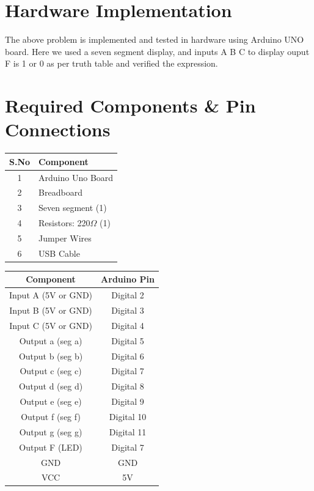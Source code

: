 \documentclass[a4paper,12pt]{article}
\begin{document}
\section*{\textbf{Hardware Implementation}}
The above problem is implemented and tested in hardware using Arduino UNO board. Here we used a seven segment display, and inputs A B C to display ouput F is 1 or 0 as per truth table and verified the expression.
\section*{Required Components \& Pin Connections}
\begin{center}
\begin{minipage}{0.45\textwidth}
\begin{table}[H]
\centering
\begin{tabular}{|c|l|}
\hline
\textbf{S.No} & \textbf{Component} \\ \hline
1 & Arduino Uno Board \\
2 & Breadboard \\
3 & Seven segment (1) \\
4 & Resistors: 220$\Omega$ (1) \\
5 & Jumper Wires \\
6 & USB Cable \\
\hline
\end{tabular}
\end{table}
\end{minipage}
\hspace{0.05\textwidth}
\begin{minipage}{0.45\textwidth}
\begin{table}[H]
\centering
\begin{tabular}{|c|c|}
\hline
\textbf{Component} & \textbf{Arduino Pin} \\ \hline
Input A (5V or GND) & Digital 2 \\
Input B (5V or GND) & Digital 3 \\
Input C (5V or GND) & Digital 4 \\
Output a (seg a) & Digital 5 \\
Output b (seg b) & Digital 6 \\
Output c (seg c) & Digital 7 \\
Output d (seg d) & Digital 8 \\
Output e (seg e) & Digital 9 \\
Output f (seg f) & Digital 10 \\
Output g (seg g) & Digital 11 \\
Output F (LED) & Digital 7 \\
GND & GND \\
VCC & 5V \\
\hline
\end{tabular}
\end{table}
\end{minipage}
\end{center}
\end{document}
